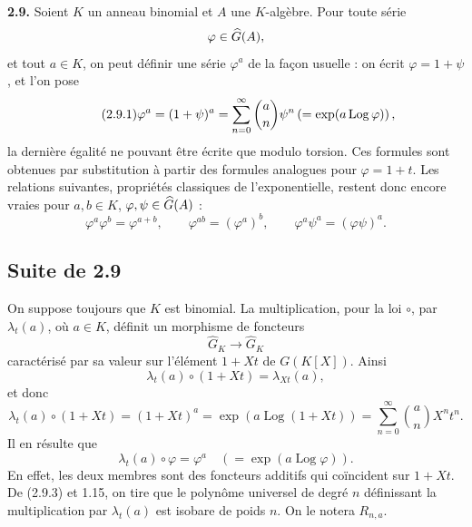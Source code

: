\documentclass[11pt]{article}
\newcommand{\Fil}{\operatorname{Fil}}
\providecommand{\eps}{\varepsilon}
\begin{document}
\textbf{2.9.} Soient \(K\) un anneau binomial et \(A\) une \(K\)-algèbre. Pour toute série
\[
  \varphi\in\Ghat(A),
\]
et tout \(a\in K\), on peut définir une série \(\varphi^a\) de la façon usuelle : on écrit \(\varphi=1+\psi\), et l'on pose
\begin{equation}\tag{2.9.1}
  \varphi^a=(1+\psi)^a
  =
  \sum_{n=0}^{\infty}\binom{a}{n}\psi^n
  \left(=\exp(a\Log\varphi)\right),
\end{equation}
la dernière égalité ne pouvant être écrite que modulo torsion. Ces formules sont obtenues par substitution à partir des formules analogues pour \(\varphi=1+t\). Les relations suivantes, propriétés classiques de l'exponentielle, restent donc encore vraies pour \(a,b\in K\), \(\varphi,\psi\in\Ghat(A)\) :
\begin{equation}\tag{2.9.2}
  \varphi^a\varphi^b=\varphi^{a+b},\qquad
  \varphi^{ab}=(\varphi^a)^b,\qquad
  \varphi^a\psi^a=(\varphi\psi)^a .
\end{equation}



\providecommand{\Ghat}{\widehat G}
\providecommand{\Gg}{\widehat G_g}
\providecommand{\Gcirc}{\widehat G_{\circ}}
\providecommand{\Gnabla}{\widehat G_{\nabla}}
\providecommand{\Grhat}{\widehat{\operatorname{Gr}}}
\providecommand{\Log}{\operatorname{Log}}
\providecommand{\Fil}{\operatorname{Fil}}
\providecommand{\eps}{\varepsilon}
\providecommand{\id}{\operatorname{id}}
\providecommand{\Sym}{\operatorname{Sym}}
\providecommand{\Mon}{\operatorname{Mon}}


\subsection*{Suite de 2.9}

On suppose toujours que \(K\) est binomial. La multiplication, pour la loi \(\circ\), par \(\lambda_t(a)\), où \(a\in K\), définit un morphisme de foncteurs
\[
  \Ghat_K\longrightarrow \Ghat_K
\]
caractérisé par sa valeur sur l'élément \(1+Xt\) de \(G(K[X])\). Ainsi
\[
  \lambda_t(a)\circ(1+Xt)=\lambda_{Xt}(a),
\]
et donc
\begin{equation}\tag{2.9.3}
  \lambda_t(a)\circ(1+Xt)
  =(1+Xt)^a
  =\exp(a\Log(1+Xt))
  =\sum_{n=0}^{\infty}\binom{a}{n}X^nt^n .
\end{equation}
Il en résulte que
\begin{equation}\tag{2.9.4}
  \lambda_t(a)\circ\varphi=\varphi^a
  \quad(=\exp(a\Log\varphi)).
\end{equation}
En effet, les deux membres sont des foncteurs additifs qui coïncident sur \(1+Xt\). De (2.9.3) et 1.15, on tire que le polynôme universel de degré \(n\) définissant la multiplication par \(\lambda_t(a)\) est isobare de poids \(n\). On le notera \(R_{n,a}\).
\end{document}
